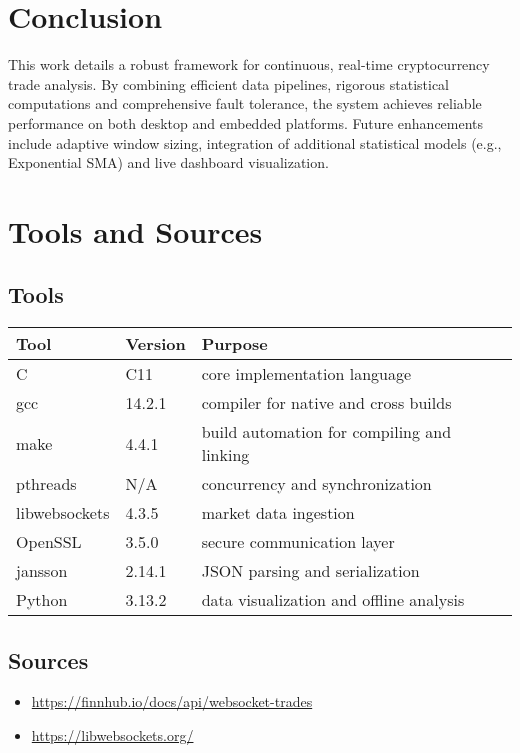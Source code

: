 \documentclass{article}
\begin{document}
\section{Conclusion}
This work details a robust framework for continuous, real-time cryptocurrency trade analysis. By combining efficient data pipelines, rigorous statistical computations and comprehensive fault tolerance, the system achieves reliable performance on both desktop and embedded platforms. Future enhancements include adaptive window sizing, integration of additional statistical models (e.g., Exponential SMA) and live dashboard visualization.

\section{Tools and Sources}

\subsection*{Tools}
\begin{tabularx}{\textwidth}{llX}
\toprule
Tool & Version & Purpose \\
\midrule
C             & C11     & core implementation language \\
gcc           & 14.2.1  & compiler for native and cross builds \\
make          & 4.4.1   & build automation for compiling and linking \\
pthreads      & N/A     & concurrency and synchronization \\
libwebsockets & 4.3.5   & market data ingestion \\
OpenSSL       & 3.5.0   & secure communication layer \\
jansson       & 2.14.1  & JSON parsing and serialization \\
Python        & 3.13.2  & data visualization and offline analysis \\
\bottomrule
\end{tabularx}

\vspace{1em}

\subsection*{Sources}
\begin{itemize}
  \item \url{https://finnhub.io/docs/api/websocket-trades}
  \item \url{https://libwebsockets.org/}
\end{itemize}
\end{document}
